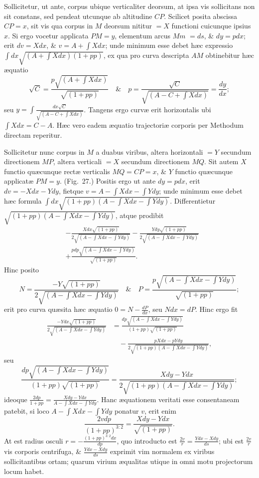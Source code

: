 Sollicitetur, ut ante, corpus ubique verticaliter deorsum, at ipsa vis sollicitans non sit constans, sed pendeat utcunque ab altitudine $CP$. Scilicet posita abscissa $CP=x$, sit vis qua corpus in $M$ deorsum nititur $=X$ functioni cuicunque ipsius $x$. Si ergo vocetur applicata $PM=y$, elementum arcus $Mm$
$=ds$, \& $dy=pdx$; erit $dv=Xdx$, \& $v=A+\int Xdx$; unde minimum esse debet hæc expressio $\int dx\sqrt{(A+\int Xdx)(1+pp)}$, ex qua pro curva descripta $AM$ obtinebitur hæc æquatio
\[\sqrt C=\frac{p\sqrt{(A+\int Xdx)}}{\sqrt{(1+pp)}}\quad\&\quad p=\frac{\sqrt C}{\sqrt{(A-C+\int Xdx)}}=\frac{dy}{dx};\]
seu $y=\int\frac{dx\sqrt C}{\sqrt{(A-C+\int Xdx)}}$. Tangens ergo curvæ erit horizontalis ubi $\int Xdx=C-A$. Hæc vero eadem æquatio trajectoriæ corporis per Methodum directam reperitur.

Sollicitetur nunc corpus in $M$ a duabus viribus, altera horizontali $=Y$ secundum directionem $MP$, altera verticali $=X$ secundum directionem $MQ$. Sit autem $X$ functio quæcunque rectæ verticalis $MQ=CP=x$, \& $Y$ functio quæcunque applicatæ $PM=y$. (Fig.~27.) Positis ergo ut ante $dy=pdx$, erit $dv=-Xdx-Ydy$, fietque $v=A-\int Xdx-\int Ydy$; unde minimum esse debet hæc formula $\int dx\sqrt{(1+pp)(A-\int Xdx-\int Ydy)}$. Differentietur $\sqrt{(1+pp)(A-\int Xdx-\int Ydy)}$, atque prodibit
\[\begin{aligned}
&-\frac{Xdx\sqrt{(1+pp)}}{2\sqrt{(A-\int Xdx-\int Ydy)}}-\frac{Ydy\sqrt{(1+pp)}}{2\sqrt{(A-\int Xdx-\int Ydy)}}\\
&+\frac{pdp\sqrt{(A-\int Xdx-\int Ydy)}}{\sqrt{(1+pp)}}.
\end{aligned}\]
Hinc posito
\[N=\frac{-Y\sqrt{(1+pp)}}{2\sqrt{(A-\int Xdx-\int Ydy)}}\quad\&\quad P=\frac{p\sqrt{(A-\int Xdx-\int Ydy)}}{\sqrt{(1+pp)}};\]
erit pro curva quæsita hæc æquatio $0=N-\frac{dP}{dx}$, seu $Ndx=dP$. Hinc ergo fit
\[\begin{aligned}
\frac{-Ydx\sqrt{(1+pp)}}{2\sqrt{(A-\int Xdx-\int Ydy)}}
&=\frac{dp\sqrt{(A-\int Xdx-\int Ydy)}}{(1+pp)\sqrt{(1+pp)}}\\
&\quad-\frac{pXdx-pYdy}{2\sqrt{(1+pp)(A-\int Xdx-\int Ydy)}},
\end{aligned}\]
seu
\[\frac{dp\sqrt{(A-\int Xdx-\int Ydy)}}{(1+pp)\sqrt{(1+pp)}}=\frac{Xdy-Ydx}{2\sqrt{(1+pp)(A-\int Xdx-\int Ydy)}};\]
ideoque $\frac{2dp}{1+pp}=\frac{Xdy-Ydx}{A-\int Xdx-\int Ydy}$. Hanc æquationem veritati esse consentaneam patebit, si loco $A-\int Xdx-\int Ydy$ ponatur $v$, erit enim
\[\frac{2vdp}{(1+pp)^{3:2}}=\frac{Xdy-Ydx}{\sqrt{(1+pp)}}.\]
At est radius osculi $r=-\frac{(1+pp)^{3:2}dx}{dp}$, quo introducto est $\frac{2v}{r}=\frac{Ydx-Xdy}{ds}$; ubi est $\frac{2v}{r}$ vis corporis centrifuga, \& $\frac{Ydx-Xdy}{ds}$ exprimit vim normalem ex viribus sollicitantibus ortam; quarum virium æqualitas utique in omni motu projectorum locum habet.

